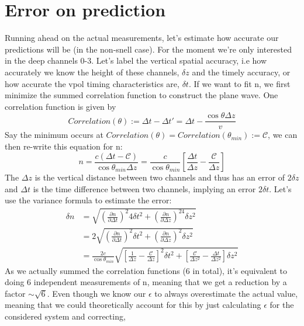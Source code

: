 \documentclass[11pt,a4paper,faculty=we,language=en,doctype=report]{cls/ugent-doc}
\begin{document}
\section{Error on prediction}
Running ahead on the actual measurements, let's estimate how accurate our
predictions will be (in the non-snell case).  For the moment we're only
interested in the deep channels 0-3. Let's label the vertical spatial accuracy,
i.e how accurately we know the height of these channels, $\delta z$ and the
timely accuracy, or how accurate the vpol timing characteristics are, $\delta
t$. If we want to fit n, we first minimize the summed correlation function to
construct the plane wave. One correlation function is given by 
\begin{equation}
	Correlation(\theta) := \Delta t - \Delta t' = \Delta t
	- \frac{\cos\theta \Delta z}{v}
\end{equation}
Say the minimum occurs at $Correlation(\theta) = Correlation(\theta_{min}) := \mathcal{C}$, we can then re-write 
this equation for n:
\begin{equation}
  n = \frac{c(\Delta t - \mathcal{C})}{\cos \theta_{min} \Delta z} = \frac{c}{\cos{\theta_{min}}}\left[\frac{\Delta t}{\Delta z} - \frac{\mathcal{C}}{\Delta z}\right]
\end{equation}
The $\Delta z$ is the vertical distance between two channels and thus has an error of $2\delta z$ and $\Delta t$ is the time
difference between two channels, implying an error $2\delta t$. Let's use the variance formula to estimate the error:
\begin{align}
  \delta n &= \sqrt{\left(\frac{\partial n}{\partial \Delta t}\right)^2 4\delta t^2 + \left(\frac{\partial n}{\partial \Delta z}\right)^24\delta z^2}\\
      &= 2\sqrt{\left(\frac{\partial n}{\partial \Delta t}\right)^2\delta t^2 + \left(\frac{\partial n}{\partial \Delta z}\right)^2\delta z^2}\\
      &= \frac{2c}{\cos{\theta_{min}}}\sqrt{\left[\frac{1}{\Delta z} - \frac{\mathcal{C}}{\Delta z}\right]^2\delta t^2 + 
      \left[\frac{\mathcal{C}}{\Delta z^2} - \frac{\Delta t}{\Delta z^2}\right]\delta z^2}
\end{align}
As we actually summed the correlation functions (6 in total), it's equivalent
to doing 6 independent measurements of n, meaning that we get a reduction by a
factor $\sim \sqrt{6}$.  Even though we know our $\epsilon$ to always
overestimate the actual value, meaning that we could theoretically account for
this by just calculating $\epsilon$ for the considered system and correcting,
\end{document}

